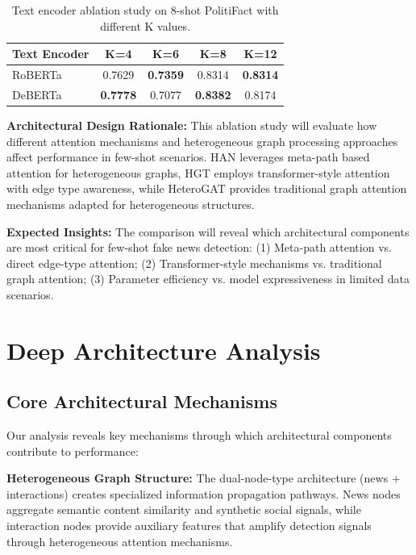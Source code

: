 \begin{table}[htbp]
\centering
\caption{Text encoder ablation study on 8-shot PolitiFact with different K values.}
\label{tab:text_encoder_ablation}
\begin{tabular}{lcccc}
\toprule
\textbf{Text Encoder} & \textbf{K=4} & \textbf{K=6} & \textbf{K=8} & \textbf{K=12} \\
\midrule
RoBERTa   & 0.7629 & \textbf{0.7359} & 0.8314 & \textbf{0.8314} \\
DeBERTa   & \textbf{0.7778} & 0.7077 & \textbf{0.8382} & 0.8174 \\
\bottomrule
\end{tabular}
\end{table}

\textbf{Architectural Design Rationale:} This ablation study will evaluate how different attention mechanisms and heterogeneous graph processing approaches affect performance in few-shot scenarios. HAN leverages meta-path based attention for heterogeneous graphs, HGT employs transformer-style attention with edge type awareness, while HeteroGAT provides traditional graph attention mechanisms adapted for heterogeneous structures.

\textbf{Expected Insights:} The comparison will reveal which architectural components are most critical for few-shot fake news detection: (1) Meta-path attention vs. direct edge-type attention; (2) Transformer-style mechanisms vs. traditional graph attention; (3) Parameter efficiency vs. model expressiveness in limited data scenarios.

\section{Deep Architecture Analysis}

\subsection{Core Architectural Mechanisms}

Our analysis reveals key mechanisms through which architectural components contribute to performance:

\textbf{Heterogeneous Graph Structure:} The dual-node-type architecture (news + interactions) creates specialized information propagation pathways. News nodes aggregate semantic content similarity and synthetic social signals, while interaction nodes provide auxiliary features that amplify detection signals through heterogeneous attention mechanisms.

